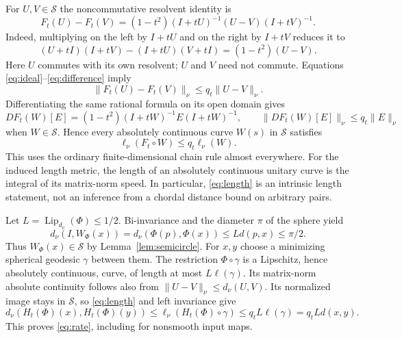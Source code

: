 \documentclass[11pt]{article}
\newcommand{\Lip}{\operatorname{Lip}}
\begin{document}
For $U,V\in\mathcal S$ the noncommutative resolvent identity is
\begin{equation}\label{eq:difference}
 F_t(U)-F_t(V)
 =(1-t^2)(I+tU)^{-1}(U-V)(I+tV)^{-1}.
\end{equation}
Indeed, multiplying on the left by $I+tU$ and on the right by $I+tV$ reduces it to
\[
 (U+tI)(I+tV)-(I+tU)(V+tI)=(1-t^2)(U-V).
\]
Here $U$ commutes with its own resolvent; $U$ and $V$ need not commute. Equations \eqref{eq:ideal}--\eqref{eq:difference} imply
\begin{equation}\label{eq:chord}
 \|F_t(U)-F_t(V)\|_\nu\le q_t\|U-V\|_\nu.
\end{equation}
Differentiating the same rational formula on its open domain gives
\begin{equation}\label{eq:differential}
 DF_t(W)[E]=(1-t^2)(I+tW)^{-1}E(I+tW)^{-1},
 \qquad \|DF_t(W)[E]\|_\nu\le q_t\|E\|_\nu
\end{equation}
when $W\in\mathcal S$. Hence every absolutely continuous curve $W(s)$ in $\mathcal S$ satisfies
\begin{equation}\label{eq:length}
 \ell_\nu(F_t\circ W)\le q_t\ell_\nu(W).
\end{equation}
This uses the ordinary finite-dimensional chain rule almost everywhere. For the induced length metric, the length of an absolutely continuous unitary curve is the integral of its matrix-norm speed. In particular, \eqref{eq:length} is an intrinsic length statement, not an inference from a chordal distance bound on arbitrary pairs.

Let $L=\Lip_{d_\nu}(\Phi)\le1/2$. Bi-invariance and the diameter $\pi$ of the sphere yield
\[
 d_\nu(I,W_\Phi(x))=d_\nu(\Phi(p),\Phi(x))\le Ld(p,x)\le\pi/2.
\]
Thus $W_\Phi(x)\in\mathcal S$ by Lemma~\ref{lem:semicircle}. For $x,y$ choose a minimizing spherical geodesic $\gamma$ between them. The restriction $\Phi\circ\gamma$ is a Lipschitz, hence absolutely continuous, curve, of length at most $L\ell(\gamma)$. Its matrix-norm absolute continuity follows also from $\|U-V\|_\nu\le d_\nu(U,V)$. Its normalized image stays in $\mathcal S$, so \eqref{eq:length} and left invariance give
\[
 d_\nu(H_t(\Phi)(x),H_t(\Phi)(y))
 \le \ell_\nu(H_t(\Phi)\circ\gamma)
 \le q_tL\ell(\gamma)=q_tLd(x,y).
\]
This proves \eqref{eq:rate}, including for nonsmooth input maps.
\end{document}
